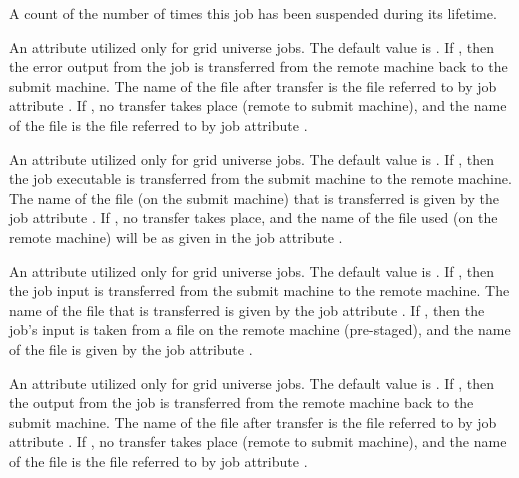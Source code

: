 \begin{description}
\item[\AdAttr{TotalSuspensions}:]  A count of the number of times this job
has been suspended during its lifetime.

\item[\AdAttr{TransferErr}:]   
An attribute utilized only for grid universe jobs.
The default value is .
If , then the error output from the job
is transferred from the remote machine back to the submit machine.
The name of the file after transfer is the file referred to
by job attribute .
If , no transfer takes place (remote to submit machine),
and the name of the file is the file referred to
by job attribute .

\item[\AdAttr{TransferExecutable}:]   
An attribute utilized only for grid universe jobs.
The default value is .
If , then the job executable is transferred from the submit
machine to the remote machine.
The name of the file (on the submit machine)
that is transferred is given by the
job attribute .
If , no transfer takes place, and
the name of the file used (on the remote machine) will be as
given in the job attribute .

\item[\AdAttr{TransferIn}:]   
An attribute utilized only for grid universe jobs.
The default value is .
If , then the job input is transferred from the submit
machine to the remote machine.
The name of the file that is transferred is given by the
job attribute .
If , then the job's input is taken from a file on the
remote machine (pre-staged), and 
the name of the file is given by the job attribute .

\item[\AdAttr{TransferOut}:]   
An attribute utilized only for grid universe jobs.
The default value is .
If , then the output from the job
is transferred from the remote machine back to the submit machine.
The name of the file after transfer is the file referred to
by job attribute .
If , no transfer takes place (remote to submit machine),
and the name of the file is the file referred to
by job attribute .


\end{description}
